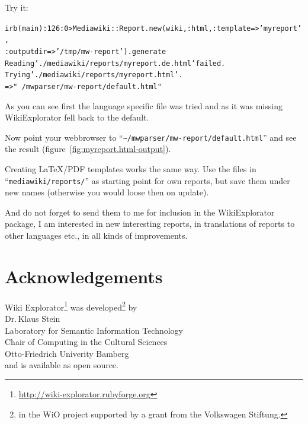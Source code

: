 \documentclass[a4paper]{scrartcl}
\newcounter{tcounter}
\newcommand{\tcount}{\makebox[0pt][r]{\tiny\thetcounter~}}
\newenvironment{typed}{\refstepcounter{tcounter}\bgroup\setlength{\topsep}{0pt}\renewcommand{\FrameCommand}[1]{\fcolorbox{black!30}{bgcolor}{##1}\tcount}\MakeFramed{\FrameRestore}\begin{alltt}\small}{\end{alltt}\endMakeFramed\egroup\par\aftergroup\noindent\aftergroup\ignorespaces}
\newcommand{\file}[1]{\texttt{\color{file}#1}}
\newcommand{\p}{\textcolor{prompt}}
\renewcommand{\c}{\textcolor{cmd}}
\begin{document}
Try it:
\begin{typed}
\p{irb(main):126:0>} \c{Mediawiki::Report.new(wiki, :html, :template => 'myreport', 
                                       :outputdir => '/tmp/mw-report').generate}
Reading './mediawiki/reports/myreport.de.html' failed. 
Trying './mediawiki/reports/myreport.html'.
=> "~/mwparser/mw-report/default.html"
\end{typed}
As you can see first the language specific file was tried and as it
was missing WikiExplorator fell back to the default.  

Now point your webbrowser to
``\file{\~{}/mwparser/mw-report/default.html}'' and see the result
(figure~\ref{fig:myreport.html-output}).

Creating \LaTeX/PDF templates works the same way. Use the files in
``\file{mediawiki/reports/}'' as starting point for own reports, but
save them under new names (otherwise you would loose then on update).

And do not forget to send them to me for inclusion in the
WikiExplorator package, I am interested in new interesting reports, in
translations of reports to other languages etc., in all kinds of
improvements.

\section{Acknowledgements}
\label{sec:ack}

Wiki Explorator\footnote{\url{http://wiki-explorator.rubyforge.org}} 
was developed\footnote{in the WiO project supported by a grant from the
  Volkswagen Stiftung.} by\\[2ex]
Dr.\,Klaus Stein\\
Laboratory for Semantic Information Technology\\
Chair of Computing in the Cultural Sciences\\
Otto-Friedrich Univerity Bamberg\\[2ex]
and is available as open source.




\end{document}
